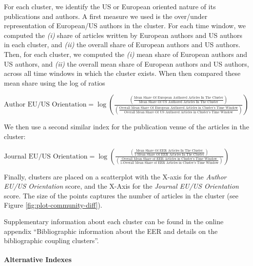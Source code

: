 \documentclass[
  12pt,
  onecolumn]{article}
\begin{document}
For each cluster, we identify the US or European oriented nature of its
publications and authors. A first measure we used is the over/under
representation of European/US authors in the cluster. For each time
window, we computed the \emph{(i)} share of articles written by European
authors and US authors in each cluster, and \emph{(ii)} the overall
share of European authors and US authors. Then, for each cluster, we
computed the \emph{(i)} mean share of European authors and US authors,
and \emph{(ii)} the overall mean share of European authors and US
authors, across all time windows in which the cluster exists. When then
compared these mean share using the log of ratios

\bigskip

\({\scriptstyle \text{Author EU/US Orientation}=\log(\frac{(\frac{\text{Mean Share Of European Authored Articles In The Cluster}}{\text{Mean Share Of US Authored Articles In The Cluster}})} {(\frac{\text{Overall Mean Share Of European Authored Articles in Cluster's Time Window}}{\text{Overall Mean Share Of US Authored Articles in Cluster's Time Window}})})}\)
\bigskip

We then use a second similar index for the publication venue of the
articles in the cluster:

\bigskip

\({\scriptstyle \text{Journal EU/US Orientation}=\log(\frac{(\frac{\text{Mean Share Of EER Articles In The Cluster}}{\text{1-Mean Share Of EER Articles In The Cluster}})} {(\frac{\text{Overall Mean Share of EER Articles in Cluster's Time Window}}{\text{1-Overall Mean Share of EER Articles in Cluster's Time Window}})})}\)
\bigskip

Finally, clusters are placed on a scatterplot with the X-axis for the
\emph{Author EU/US Orientation} score, and the X-Axis for the
\emph{Journal EU/US Orientation} score. The size of the points captures
the number of articles in the cluster (see Figure
\ref{fig:plot-community-diff}).

Supplementary information about each cluster can be found in the online
appendix ``Bibliographic information about the EER and details on the
bibliographic coupling clusters''.

\hypertarget{alt-index}{%
\paragraph*{Alternative Indexes}\label{alt-index}}
\end{document}
